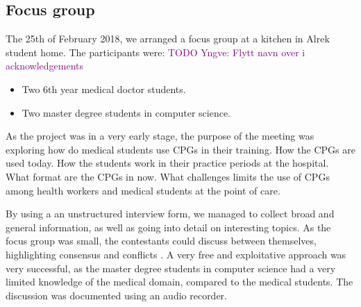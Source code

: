 \subsection{Focus group}
The 25th of February 2018, we arranged a focus group at a kitchen in Alrek student home. The participants were:
\textcolor{purple}{TODO Yngve: Flytt navn over i acknowledgements}
\begin{itemize}
	\item Two 6th year medical doctor students.
	\item Two master degree students in computer science.
\end{itemize}

As the project was in a very early stage, the purpose of the meeting was exploring how do medical students use CPGs in their training. How the CPGs are used today. How the students work in their practice periods at the hospital. What format are the CPGs in now. What challenges limits the use of CPGs among health workers and medical students at the point of care.

By using a an unstructured interview form, we managed to collect broad and general information, as well as going into detail on interesting topics. As the focus group was small, the contestants could discuss between themselves, highlighting consensus and conflicts \parencite{Preece2015}. A very free and exploitative approach was very successful, as the master degree students in computer science had a very limited knowledge of the medical domain, compared to the medical students. The discussion was documented using an audio recorder.

